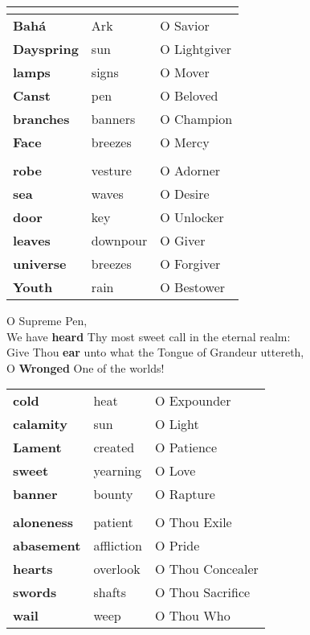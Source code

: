\documentclass[14pt]{extarticle}
\begin{document}
\begin{hafez}{}{}
\begin{tabular}{|l|l|l|}
  \multicolumn{3}{c}{}           \\ \hline
  \textbf{Bahá}        & Ark         & O Savior      \\
  \textbf{Dayspring}   & sun         & O Lightgiver  \\
  \textbf{lamps}       & signs       & O Mover       \\
  \textbf{Canst}       & pen         & O Beloved     \\
  \textbf{branches}    & banners     & O Champion    \\
  \textbf{Face}        & breezes     & O Mercy       \\ \hline

  \multicolumn{3}{c}{}           \\ \hline
  \textbf{robe}        & vesture     & O Adorner     \\
  \textbf{sea}         & waves       & O Desire      \\
  \textbf{door}        & key         & O Unlocker    \\
  \textbf{leaves}      & downpour    & O Giver       \\
  \textbf{universe}    & breezes     & O Forgiver    \\
  \textbf{Youth}       & rain        & O Bestower    \\ \hline
  \end{tabular}

  O Supreme Pen, \\
  We have \textbf{heard} Thy most sweet call in the eternal realm: \\
  Give Thou \textbf{ear} unto what the Tongue of Grandeur uttereth, \\
  O \textbf{Wronged} One of the worlds!

  \begin{tabular}{|l|l|l|}
  \hline
  \textbf{cold}     & heat     & O Expounder \\
  \textbf{calamity} & sun      & O Light     \\
  \textbf{Lament}   & created  & O Patience  \\
  \textbf{sweet}    & yearning & O Love      \\
  \textbf{banner}   & bounty   & O Rapture   \\ \hline

  \multicolumn{3}{c}{} \\ \hline
  \textbf{aloneness} & patient    & O Thou Exile     \\
  \textbf{abasement} & affliction & O Pride          \\
  \textbf{hearts}    & overlook   & O Thou Concealer \\
  \textbf{swords}    & shafts     & O Thou Sacrifice \\
  \textbf{wail}      & weep       & O Thou Who       \\ \hline
  \end{tabular}


\end{hafez}
\end{document}
